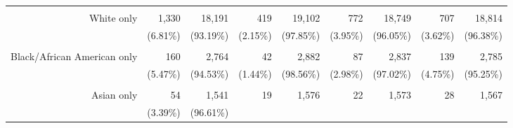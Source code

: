 \documentclass{article}
\begin{document}
\begin{table}[!h]
{\begin{tabular}{lllllllll}
			\multicolumn{1}{r}{} &
			\multicolumn{1}{r}{} &
			\multicolumn{1}{r}{} &
			\multicolumn{1}{r}{} \\
			\multicolumn{1}{r}{White only\hspace{1em}} &
			\multicolumn{1}{|r}{1,330} &
			\multicolumn{1}{r}{18,191} &
			\multicolumn{1}{r}{419} &
			\multicolumn{1}{r}{19,102} &
			\multicolumn{1}{r}{772} &
			\multicolumn{1}{r}{18,749} &
			\multicolumn{1}{r}{707} &
			\multicolumn{1}{r}{18,814} \\
			\multicolumn{1}{r}{} &
			\multicolumn{1}{|r}{(6.81\%)} &
			\multicolumn{1}{r}{(93.19\%)} &
			\multicolumn{1}{r}{(2.15\%)} &
			\multicolumn{1}{r}{(97.85\%)} &
			\multicolumn{1}{r}{(3.95\%)} &
			\multicolumn{1}{r}{(96.05\%)} &
			\multicolumn{1}{r}{(3.62\%)} &
			\multicolumn{1}{r}{(96.38\%)} \\
			\multicolumn{1}{r}{} &
			\multicolumn{1}{|r}{} &
			\multicolumn{1}{r}{} &
			\multicolumn{1}{r}{} &
			\multicolumn{1}{r}{} &
			\multicolumn{1}{r}{} &
			\multicolumn{1}{r}{} &
			\multicolumn{1}{r}{} &
			\multicolumn{1}{r}{} \\
			\multicolumn{1}{r}{Black/African American only\hspace{1em}} &
			\multicolumn{1}{|r}{160} &
			\multicolumn{1}{r}{2,764} &
			\multicolumn{1}{r}{42} &
			\multicolumn{1}{r}{2,882} &
			\multicolumn{1}{r}{87} &
			\multicolumn{1}{r}{2,837} &
			\multicolumn{1}{r}{139} &
			\multicolumn{1}{r}{2,785} \\
			\multicolumn{1}{r}{} &
			\multicolumn{1}{|r}{(5.47\%)} &
			\multicolumn{1}{r}{(94.53\%)} &
			\multicolumn{1}{r}{(1.44\%)} &
			\multicolumn{1}{r}{(98.56\%)} &
			\multicolumn{1}{r}{(2.98\%)} &
			\multicolumn{1}{r}{(97.02\%)} &
			\multicolumn{1}{r}{(4.75\%)} &
			\multicolumn{1}{r}{(95.25\%)} \\
			\multicolumn{1}{r}{} &
			\multicolumn{1}{|r}{} &
			\multicolumn{1}{r}{} &
			\multicolumn{1}{r}{} &
			\multicolumn{1}{r}{} &
			\multicolumn{1}{r}{} &
			\multicolumn{1}{r}{} &
			\multicolumn{1}{r}{} &
			\multicolumn{1}{r}{} \\
			\multicolumn{1}{r}{Asian only\hspace{1em}} &
			\multicolumn{1}{|r}{54} &
			\multicolumn{1}{r}{1,541} &
			\multicolumn{1}{r}{19} &
			\multicolumn{1}{r}{1,576} &
			\multicolumn{1}{r}{22} &
			\multicolumn{1}{r}{1,573} &
			\multicolumn{1}{r}{28} &
			\multicolumn{1}{r}{1,567} \\
			\multicolumn{1}{r}{} &
			\multicolumn{1}{|r}{(3.39\%)} &
			\multicolumn{1}{r}{(96.61\%)} &

\end{tabular}}
\end{table}
\end{document}

